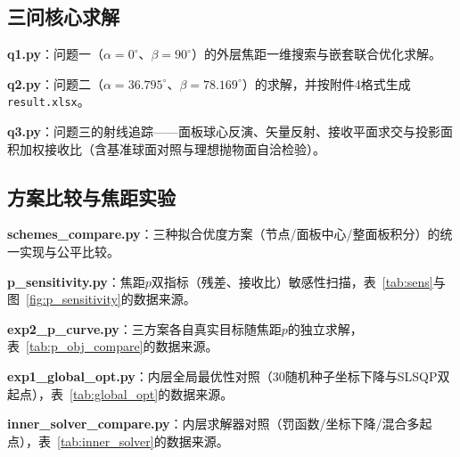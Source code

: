 \documentclass[withoutpreface]{cumcmthesis}
\begin{document}


\subsection{三问核心求解}

\textbf{q1.py}：问题一（$\alpha=0^{\circ}$、$\beta=90^{\circ}$）的外层焦距一维搜索与嵌套联合优化求解。



\textbf{q2.py}：问题二（$\alpha=36.795^{\circ}$、$\beta=78.169^{\circ}$）的求解，并按附件4格式生成\texttt{result.xlsx}。



\textbf{q3.py}：问题三的射线追踪——面板球心反演、矢量反射、接收平面求交与投影面积加权接收比（含基准球面对照与理想抛物面自洽检验）。



\subsection{方案比较与焦距实验}

\textbf{schemes\_compare.py}：三种拟合优度方案（节点/面板中心/整面板积分）的统一实现与公平比较。



\textbf{p\_sensitivity.py}：焦距$p$双指标（残差、接收比）敏感性扫描，表~\ref{tab:sens}与图~\ref{fig:p_sensitivity}的数据来源。



\textbf{exp2\_p\_curve.py}：三方案各自真实目标随焦距$p$的独立求解，表~\ref{tab:p_obj_compare}的数据来源。



\textbf{exp1\_global\_opt.py}：内层全局最优性对照（$30$随机种子坐标下降与SLSQP双起点），表~\ref{tab:global_opt}的数据来源。



\textbf{inner\_solver\_compare.py}：内层求解器对照（罚函数/坐标下降/混合多起点），表~\ref{tab:inner_solver}的数据来源。


\end{document}
